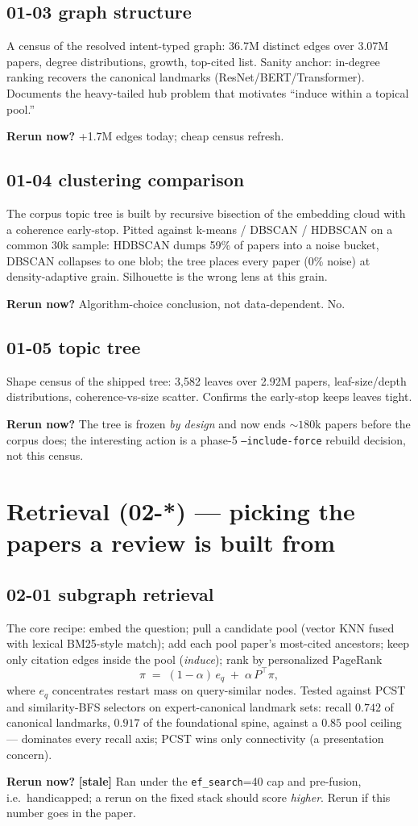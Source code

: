 \documentclass[10pt]{article}
\newcommand{\rerun}[1]{\par\smallskip\noindent\textbf{Rerun now?} #1}
\newcommand{\stale}{\textbf{[stale]} }
\begin{document}
\subsection*{01-03 graph structure}
A census of the resolved intent-typed graph: 36.7M distinct edges over 3.07M papers, degree
distributions, growth, top-cited list. Sanity anchor: in-degree ranking recovers the canonical
landmarks (ResNet/BERT/Transformer). Documents the heavy-tailed hub problem that motivates
``induce within a topical pool.''
\rerun{+1.7M edges today; cheap census refresh.}

\subsection*{01-04 clustering comparison}
The corpus topic tree is built by recursive bisection of the embedding cloud with a coherence
early-stop. Pitted against k-means / DBSCAN / HDBSCAN on a common 30k sample: HDBSCAN dumps
59\% of papers into a noise bucket, DBSCAN collapses to one blob; the tree places every paper
(0\% noise) at density-adaptive grain. Silhouette is the wrong lens at this grain.
\rerun{Algorithm-choice conclusion, not data-dependent. No.}

\subsection*{01-05 topic tree}
Shape census of the shipped tree: 3{,}582 leaves over 2.92M papers, leaf-size/depth
distributions, coherence-vs-size scatter. Confirms the early-stop keeps leaves tight.
\rerun{The tree is frozen \emph{by design} and now ends ${\sim}180$k papers before the corpus
does; the interesting action is a phase-5 \texttt{--include-force} rebuild decision, not this
census.}

\section{Retrieval (02-*) --- picking the papers a review is built from}

\subsection*{02-01 subgraph retrieval}
The core recipe: embed the question; pull a candidate pool (vector KNN fused with lexical
BM25-style match); add each pool paper's most-cited ancestors; keep only citation edges inside
the pool (\emph{induce}); rank by personalized PageRank
\begin{equation}
\pi \;=\; (1-\alpha)\, e_q \;+\; \alpha\, P^{\!\top} \pi ,
\end{equation}
where $e_q$ concentrates restart mass on query-similar nodes. Tested against PCST and
similarity-BFS selectors on expert-canonical landmark sets: recall $0.742$ of canonical
landmarks, $0.917$ of the foundational spine, against a $0.85$ pool ceiling --- dominates every
recall axis; PCST wins only connectivity (a presentation concern).
\rerun{\stale Ran under the \texttt{ef\_search}=40 cap and pre-fusion, i.e.\ handicapped; a
rerun on the fixed stack should score \emph{higher}. Rerun if this number goes in the paper.}
\end{document}
